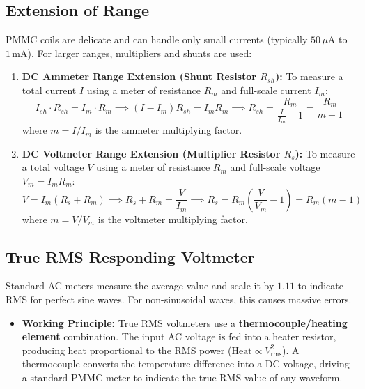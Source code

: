 \documentclass[12pt,a4paper]{article}
\begin{document}
\subsection{Extension of Range}
PMMC coils are delicate and can handle only small currents (typically $50\,\mu\text{A}$ to $1\,\text{mA}$). For larger ranges, multipliers and shunts are used:

\begin{tcolorbox}[formulabox, title={\textbf{Range Extension Calculations}}]
\begin{enumerate}[leftmargin=*, itemsep=4pt, label=\arabic*.]
  \item \textbf{DC Ammeter Range Extension (Shunt Resistor $R_{sh}$):}
    To measure a total current $I$ using a meter of resistance $R_m$ and full-scale current $I_m$:
    $$I_{sh} \cdot R_{sh} = I_m \cdot R_m \implies (I - I_m)R_{sh} = I_m R_m \implies R_{sh} = \frac{R_m}{\frac{I}{I_m} - 1} = \frac{R_m}{m - 1}$$
    where $m = I/I_m$ is the ammeter multiplying factor.
  \item \textbf{DC Voltmeter Range Extension (Multiplier Resistor $R_s$):}
    To measure a total voltage $V$ using a meter of resistance $R_m$ and full-scale voltage $V_m = I_m R_m$:
    $$V = I_m (R_s + R_m) \implies R_s + R_m = \frac{V}{I_m} \implies R_s = R_m \left(\frac{V}{V_m} - 1\right) = R_m(m - 1)$$
    where $m = V/V_m$ is the voltmeter multiplying factor.
\end{enumerate}
\end{tcolorbox}

\subsection{True RMS Responding Voltmeter}
Standard AC meters measure the average value and scale it by $1.11$ to indicate RMS for perfect sine waves. For non-sinusoidal waves, this causes massive errors.

\begin{itemize}[leftmargin=*, itemsep=3.5pt]
  \item \textbf{Working Principle:} True RMS voltmeters use a \textbf{thermocouple/heating element} combination. The input AC voltage is fed into a heater resistor, producing heat proportional to the RMS power ($\text{Heat} \propto V_{\text{rms}}^2$). A thermocouple converts the temperature difference into a DC voltage, driving a standard PMMC meter to indicate the true RMS value of any waveform.
\end{itemize}
\end{document}
